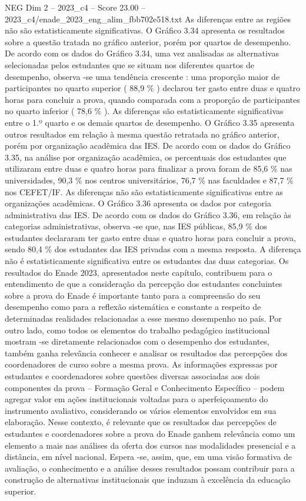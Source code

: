 \begin{textsample}{NEG Dim 2 – 2023\_c4 – Score 23.00 – 2023\_c4/enade\_2023\_eng\_alim\_fbb702e518.txt}
As diferenças entre as regiões não são estatisticamente significativas.
O Gráfico 3.34 apresenta os resultados sobre a questão tratada no gráfico anterior, porém por quartos de desempenho.
De acordo com os dados do Gráfico 3.34, uma vez analisadas as alternativas selecionadas pelos estudantes que se situam nos diferentes quartos de desempenho, observa -se uma tendência crescente : uma proporção maior de participantes no quarto superior ( 88,9 \% ) declarou ter gasto entre duas e quatro horas para concluir a prova, quando comparada com a proporção de participantes no quarto inferior ( 78,6 \% ).
As diferenças são estatisticamente significativas entre o 1.º quarto e os demais quartos de desempenho.
O Gráfico 3.35 apresenta outros resultados em relação à mesma questão retratada no gráfico anterior, porém por organização acadêmica das IES.
De acordo com os dados do Gráfico 3.35, na análise por organização acadêmica, os percentuais dos estudantes que utilizaram entre duas e quatro horas para finalizar a prova foram de 85,6 \% nas universidades, 90,3 \% nos centros universitários, 76,7 \% nas faculdades e 87,7 \% nos CEFET/IF.
As diferenças não são estatisticamente significativas entre as organizações acadêmicas.
O Gráfico 3.36 apresenta os dados por categoria administrativa das IES.
De acordo com os dados do Gráfico 3.36, em relação às categorias administrativas, observa -se que, nas IES públicas, 85,9 \% dos estudantes declararam ter gasto entre duas e quatro horas para concluir a prova, sendo 80,4 \% dos estudantes das IES privadas com a mesma resposta.
A diferença não é estatisticamente significativa entre os estudantes das duas categorias.
Os resultados do Enade 2023, apresentados neste capítulo, contribuem para o entendimento de que a consideração da percepção dos estudantes concluintes sobre a prova do Enade é importante tanto para a compreensão do seu desempenho como para a reflexão sistemática e constante a respeito de determinadas realidades relacionadas a esse mesmo desempenho no país.
Por outro lado, como todos os elementos do trabalho pedagógico institucional mostram -se diretamente relacionados com o desempenho dos estudantes, também ganha relevância conhecer e analisar os resultados das percepções dos coordenadores de curso sobre a mesma prova.
As informações expressas por estudantes e coordenadores sobre questões diversas associadas aos dois componentes da prova – Formação Geral e Conhecimento Específico – podem agregar valor em ações institucionais voltadas para o aperfeiçoamento do instrumento avaliativo, considerando os vários elementos envolvidos em sua elaboração.
Nesse contexto, é relevante que os resultados das percepções de estudantes e coordenadores sobre a prova do Enade ganhem relevância como um elemento a mais nas análises da oferta dos cursos nas modalidades presencial e a distância, em nível nacional.
Espera -se, assim, que, em uma visão formativa de avaliação, o conhecimento e a análise desses resultados possam contribuir para a construção de alternativas institucionais que induzam à excelência da educação superior.

\end{textsample}
